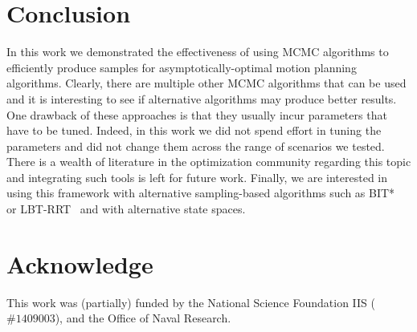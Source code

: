 \documentclass[letterpaper, 10 pt, conference]{ieeeconf}  %
\begin{document}
\section{Conclusion}
\label{sec:future}

In this work we demonstrated the effectiveness of using MCMC algorithms to 
efficiently produce samples for asymptotically-optimal motion planning algorithms.
Clearly, there are multiple other MCMC algorithms that can be used and it is interesting to see if alternative algorithms may produce better results.
One drawback of these approaches is that they usually incur parameters that have to be tuned. Indeed, in this work we did not spend effort in tuning the parameters and did not change them across the range of scenarios we tested. 
There is a wealth of literature in the optimization community regarding this topic and integrating  such tools is left for future work.
Finally, we are interested in using this framework with alternative sampling-based algorithms such as BIT*~\cite{GSB15} or LBT-RRT~\cite{SH16} and with alternative state spaces.

\section{Acknowledge}

This work was (partially) funded by the National Science Foundation IIS ($\#1409003$), and the Office of Naval Research.




%
\end{document}
